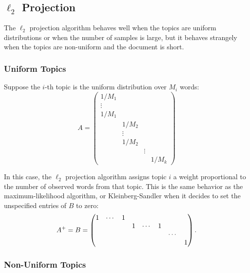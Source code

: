 \documentclass{article}
\begin{document}
\subsection{\(\ell_2\) Projection}

The \(\ell_2\) projection algorithm behaves well when the topics are uniform distributions or when the number of samples is large, but it behaves strangely when the topics are non-uniform and the document is short.

\subsubsection{Uniform Topics}

Suppose the \(i\)-th topic is the uniform distribution over \(M_i\) words:
\[
    A =
    \begin{pmatrix}
        1/M_1  &        &        &
    \\  \vdots &        &        &
    \\  1/M_1  &        &        &
    \\         & 1/M_2  &        &
    \\         & \vdots &        &
    \\         & 1/M_2  &        &
    \\         &        & \vdots &
    \\         &        &        & 1/M_k
    \end{pmatrix}
\]

In this case, the \(\ell_2\) projection algorithm assigns topic \(i\) a weight proportional to the number of observed words from that topic.
This is the same behavior as the maximum-likelihood algorithm, or Kleinberg-Sandler when it decides to set the unspecified entries of \(B\) to zero:
\[
    A^+ = B =
    \begin{pmatrix}
        1 & \cdots & 1 &   &        &   &        &
    \\    &        &   & 1 & \cdots & 1 &        &
    \\    &        &   &   &        &   & \cdots &
    \\    &        &   &   &        &   &        & 1
    \end{pmatrix}
    \ldotp
\]

\subsubsection{Non-Uniform Topics}
\end{document}
